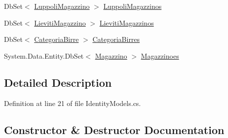 \begin{DoxyCompactItemize}
Db\+Set$<$ \mbox{\hyperlink{class_brew_day2_1_1_models_1_1_luppoli_magazzino}{Luppoli\+Magazzino}} $>$ \mbox{\hyperlink{class_brew_day2_1_1_models_1_1_application_db_context_a35a17c17087a6fd896adb661d4e74ac8}{Luppoli\+Magazzinos}}
\item 
Db\+Set$<$ \mbox{\hyperlink{class_brew_day2_1_1_models_1_1_lieviti_magazzino}{Lieviti\+Magazzino}} $>$ \mbox{\hyperlink{class_brew_day2_1_1_models_1_1_application_db_context_acf731a2c6402ba71ce651024c140c2ea}{Lieviti\+Magazzinos}}
\item 
Db\+Set$<$ \mbox{\hyperlink{class_brew_day2_1_1_models_1_1_categoria_birre}{Categoria\+Birre}} $>$ \mbox{\hyperlink{class_brew_day2_1_1_models_1_1_application_db_context_af4001a5a823bae72a940decc49807ae2}{Categoria\+Birres}}
\item 
System.\+Data.\+Entity.\+Db\+Set$<$ \mbox{\hyperlink{class_brew_day2_1_1_models_1_1_magazzino}{Magazzino}} $>$ \mbox{\hyperlink{class_brew_day2_1_1_models_1_1_application_db_context_af2f8957dbd2477ade182c27828cae79c}{Magazzinoes}}
\end{DoxyCompactItemize}


\subsection{Detailed Description}


Definition at line 21 of file Identity\+Models.\+cs.



\subsection{Constructor \& Destructor Documentation}
\mbox{\label{class_brew_day2_1_1_models_1_1_application_db_context_a0a3608913cebe6dde245797434dee7d7}} 
